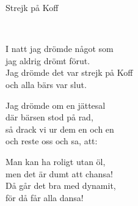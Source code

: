 \begin{song}{Strejk på Koff}
	
	
	\\
	
	
	I natt jag drömde något som\\
	jag aldrig drömt förut.\\
	Jag drömde det var strejk på Koff\\
	och alla bärs var slut.
	
	Jag drömde om en jättesal\\
	där bärsen stod på rad,\\
	så drack vi ur dem en och en\\
	och reste oss och sa, att:
	
	Man kan ha roligt utan öl,\\
	men det är dumt att chansa!\\
	Då går det bra med dynamit,\\
	för då får alla dansa!
	
\end{song}

